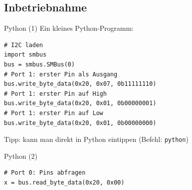\documentclass{beamer}
\begin{document}
\subsection{Inbetriebnahme}

\begin{frame}[fragile]{Python (1)}
 Ein kleines Python-Programm:
 \lstset{language=Python}
 \begin{lstlisting}
# I2C laden
import smbus
bus = smbus.SMBus(0)
# Port 1: erster Pin als Ausgang
bus.write_byte_data(0x20, 0x07, 0b11111110)
# Port 1: erster Pin auf High
bus.write_byte_data(0x20, 0x01, 0b00000001)
# Port 1: erster Pin auf Low
bus.write_byte_data(0x20, 0x01, 0b00000000)
 \end{lstlisting}
 Tipp: kann man direkt in Python eintippen (Befehl: \lstinline[language=bash]|python|)
\end{frame}

\begin{frame}[fragile]{Python (2)}
 \begin{lstlisting}
# Port 0: Pins abfragen
x = bus.read_byte_data(0x20, 0x00)
 \end{lstlisting}
\end{frame}
\end{document}
